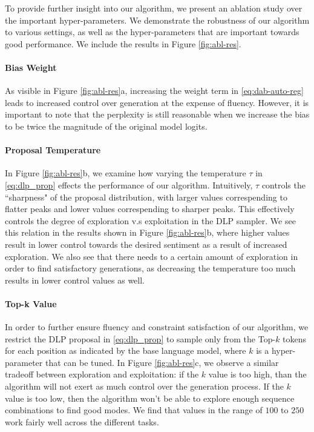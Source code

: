 
To provide further insight into our algorithm, we present an ablation study over the important hyper-parameters. We demonstrate the robustness of our algorithm to various settings, as well as the hyper-parameters that are important towards good performance. We include the results in Figure \ref{fig:abl-res}.

\paragraph{Bias Weight} As visible in Figure \ref{fig:abl-res}a, increasing the weight term in \eqref{eq:dab-auto-reg} leads to increased control over generation at the expense of fluency. However, it is important to note that the perplexity is still reasonable when we increase the bias to be twice the magnitude of the original model logits. 

\paragraph{Proposal Temperature} In Figure \ref{fig:abl-res}b, we examine how varying the temperature $\tau$ in \eqref{eq:dlp_prop} effects the performance of our algorithm. Intuitively, $\tau$ controls the ``sharpness" of the proposal distribution, with larger values correspending to flatter peaks and lower values correspending to sharper peaks. This effectively controls the degree of exploration v.s exploitation in the DLP sampler. We see this relation in the results shown in Figure \ref{fig:abl-res}b, where higher values result in lower control towards the desired sentiment as a result of increased exploration. We also see that there needs to a certain amount of exploration in order to find satisfactory generations, as decreasing the temperature too much results in lower control values as well. 

\paragraph{Top-k Value} In order to further ensure fluency and constraint satisfaction of our algorithm, we restrict the DLP proposal in \eqref{eq:dlp_prop} to sample only from the Top-$k$ tokens for each position as indicated by the base language model, where $k$ is a hyper-parameter that can be tuned. In Figure \ref{fig:abl-res}c, we observe a similar tradeoff between exploration and exploitation: if the $k$ value is too high, than the algorithm will not exert as much control over the generation process. If the $k$ value is too low, then the algorithm won't be able to explore enough sequence combinations to find good modes. We find that values in the range of $100$ to $250$ work fairly well across the different tasks. 

